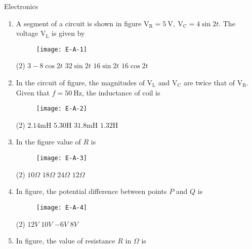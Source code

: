 \begin{abox}
	Electronics
	\end{abox}
\begin{enumerate}
	\item A segment of a circuit is shown in figure $\mathrm{V}_{\mathrm{R}}=5 \mathrm{~V}, \mathrm{~V}_{\mathrm{C}}=4 \sin 2 t$. The voltage $\mathrm{V}_{\mathrm{L}}$ is given by
	\begin{figure}[H]
		\centering
		\texttt{[image: E-A-1]}
	\end{figure}
	 \begin{tasks}(2)
		\task[\textbf{a.}]$3-8 \cos 2 t$
		\task[\textbf{b.}]$32 \sin 2 t$
		\task[\textbf{c.}]$16 \sin 2 t$
		\task[\textbf{d.}]  $16 \cos 2 t$
	\end{tasks}
	\item In the circuit of figure, the magnitudes of $\mathrm{V}_{\mathrm{L}}$ and $\mathrm{V}_{\mathrm{C}}$ are twice that of $\mathrm{V}_{\mathrm{R}}$. Given that $f=50 \mathrm{~Hz}$, the inductance of coil is
	\begin{figure}[H]
		\centering
		\texttt{[image: E-A-2]}
		\caption{}
		\label{}
	\end{figure}
	 \begin{tasks}(2)
		\task[\textbf{a.}] $2.14 \mathrm{mH}$
		\task[\textbf{b.}] $5.30 \mathrm{H}$
		\task[\textbf{c.}] $31.8 \mathrm{mH}$
		\task[\textbf{d.}] $1.32 \mathrm{H}$
	\end{tasks}
	\item In the figure value of $R$ is
	\begin{figure}[H]
		\centering
		\texttt{[image: E-A-3]}
		\caption{}
		\label{}
	\end{figure}
	 \begin{tasks}(2)
		\task[\textbf{a.}]$10\Omega$
		\task[\textbf{b.}]$18\Omega$
		\task[\textbf{c.}]$24\Omega$
		\task[\textbf{d.}] $12\Omega$
	\end{tasks}
	\item In figure, the potential difference between points $P$ and $Q$ is
	\begin{figure}[H]
		\centering
		\texttt{[image: E-A-4]}
		\caption{}
		\label{}
	\end{figure}
	 \begin{tasks}(2)
		\task[\textbf{a.}]$12V$
		\task[\textbf{b.}]$10V$
		\task[\textbf{c.}]$-6V$
		\task[\textbf{d.}] $8V$
	\end{tasks}
	\item In figure, the value of resistance $R$ in $\Omega$ is

\end{enumerate}
